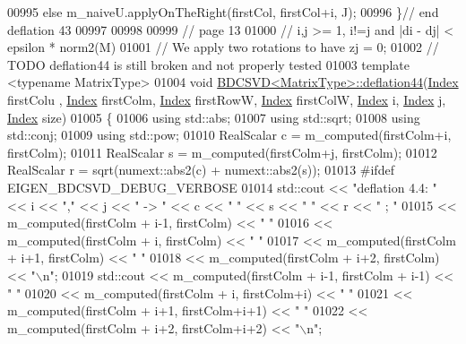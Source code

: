 \begin{DoxyCode}
00995   \textcolor{keywordflow}{else}          m\_naiveU.applyOnTheRight(firstCol, firstCol+i, J);
00996 \}\textcolor{comment}{// end deflation 43}
00997 
00998 
00999 \textcolor{comment}{// page 13}
01000 \textcolor{comment}{// i,j >= 1, i!=j and |di - dj| < epsilon * norm2(M)}
01001 \textcolor{comment}{// We apply two rotations to have zj = 0;}
01002 \textcolor{comment}{// TODO deflation44 is still broken and not properly tested}
01003 \textcolor{keyword}{template} <\textcolor{keyword}{typename} MatrixType>
01004 \textcolor{keywordtype}{void} \hyperlink{group___s_v_d___module_class_eigen_1_1_b_d_c_s_v_d}{BDCSVD<MatrixType>::deflation44}(\hyperlink{namespace_eigen_a62e77e0933482dafde8fe197d9a2cfde}{Index} firstColu , 
      \hyperlink{namespace_eigen_a62e77e0933482dafde8fe197d9a2cfde}{Index} firstColm, \hyperlink{namespace_eigen_a62e77e0933482dafde8fe197d9a2cfde}{Index} firstRowW, \hyperlink{namespace_eigen_a62e77e0933482dafde8fe197d9a2cfde}{Index} firstColW, \hyperlink{namespace_eigen_a62e77e0933482dafde8fe197d9a2cfde}{Index} i, 
      \hyperlink{namespace_eigen_a62e77e0933482dafde8fe197d9a2cfde}{Index} j, \hyperlink{namespace_eigen_a62e77e0933482dafde8fe197d9a2cfde}{Index} size)
01005 \{
01006   \textcolor{keyword}{using} std::abs;
01007   \textcolor{keyword}{using} std::sqrt;
01008   \textcolor{keyword}{using} std::conj;
01009   \textcolor{keyword}{using} std::pow;
01010   RealScalar c = m\_computed(firstColm+i, firstColm);
01011   RealScalar s = m\_computed(firstColm+j, firstColm);
01012   RealScalar r = sqrt(numext::abs2(c) + numext::abs2(s));
01013 \textcolor{preprocessor}{#ifdef  EIGEN\_BDCSVD\_DEBUG\_VERBOSE}
01014   std::cout << \textcolor{stringliteral}{"deflation 4.4: "} << i << \textcolor{stringliteral}{","} << j << \textcolor{stringliteral}{" -> "} << c << \textcolor{stringliteral}{" "} << s << \textcolor{stringliteral}{" "} << r << \textcolor{stringliteral}{" ; "}
01015     << m\_computed(firstColm + i-1, firstColm)  << \textcolor{stringliteral}{" "}
01016     << m\_computed(firstColm + i, firstColm)  << \textcolor{stringliteral}{" "}
01017     << m\_computed(firstColm + i+1, firstColm) << \textcolor{stringliteral}{" "}
01018     << m\_computed(firstColm + i+2, firstColm) << \textcolor{stringliteral}{"\(\backslash\)n"};
01019   std::cout << m\_computed(firstColm + i-1, firstColm + i-1)  << \textcolor{stringliteral}{" "}
01020     << m\_computed(firstColm + i, firstColm+i)  << \textcolor{stringliteral}{" "}
01021     << m\_computed(firstColm + i+1, firstColm+i+1) << \textcolor{stringliteral}{" "}
01022     << m\_computed(firstColm + i+2, firstColm+i+2) << \textcolor{stringliteral}{"\(\backslash\)n"};

\end{DoxyCode}
